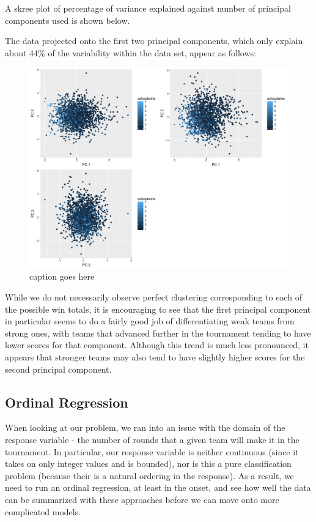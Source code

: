 \documentclass[10pt,a4paper, hidelinks]{article} %
\begin{document}
A skree plot of percentage of variance explained against number of principal components used is shown below. 


The data projected onto the first two principal components, which only explain about 44\% of the variability within the data set, appear as follows:

\begin{figure}[H]
	\centering
	\includegraphics[width=0.7\linewidth]{../fig/PrinComps}
	\caption{caption goes here}
	\label{fig:princomps}
\end{figure}


While we do not necessarily observe perfect clustering corresponding to each of the possible win totals, it is encouraging to see that the first principal component in particular seems to do a fairly good job of differentiating weak teams from strong ones, with teams that advanced further in the tournament tending to have lower scores for that component. Although this trend is much less pronounced, it appears that stronger teams may also tend to have slightly higher scores for the second principal component. 


\subsection{Ordinal Regression}

When looking at our problem, we ran into an issue with the domain of the response variable - the number of rounds that a given team will make it in the tournament. In particular, our response variable is neither continuous (since it takes on only integer values and is bounded), nor is this a pure classification problem (because their is a natural ordering in the response). As a result, we need to run an ordinal regression, at least in the onset, and see how well the data can be summarized with these approaches before we can move onto more complicated models. 
\end{document}
